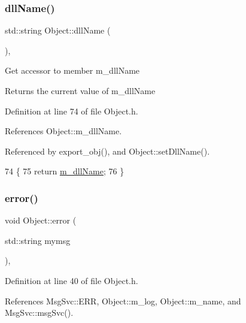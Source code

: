\subsubsection{\texorpdfstring{dll\+Name()}{dllName()}}
{\footnotesize\ttfamily std\+::string Object\+::dll\+Name (\begin{DoxyParamCaption}{ }\end{DoxyParamCaption})\hspace{0.3cm}{\ttfamily [inline]}, {\ttfamily [inherited]}}

Get accessor to member m\+\_\+dll\+Name \begin{DoxyReturn}{Returns}
the current value of m\+\_\+dll\+Name 
\end{DoxyReturn}


Definition at line 74 of file Object.\+h.



References Object\+::m\+\_\+dll\+Name.



Referenced by export\+\_\+obj(), and Object\+::set\+Dll\+Name().


\begin{DoxyCode}
74                        \{
75     \textcolor{keywordflow}{return} \hyperlink{classObject_a01afbeacebb8db6831559972ec362eb3}{m\_dllName};
76   \}  
\end{DoxyCode}
\mbox{\label{classObject_a204a95f57818c0f811933917a30eff45}} 
\subsubsection{\texorpdfstring{error()}{error()}\hspace{0.1cm}{\footnotesize\ttfamily [1/2]}}
{\footnotesize\ttfamily void Object\+::error (\begin{DoxyParamCaption}\item[{std\+::string}]{mymsg }\end{DoxyParamCaption})\hspace{0.3cm}{\ttfamily [inline]}, {\ttfamily [inherited]}}



Definition at line 40 of file Object.\+h.



References Msg\+Svc\+::\+E\+RR, Object\+::m\+\_\+log, Object\+::m\+\_\+name, and Msg\+Svc\+::msg\+Svc().



